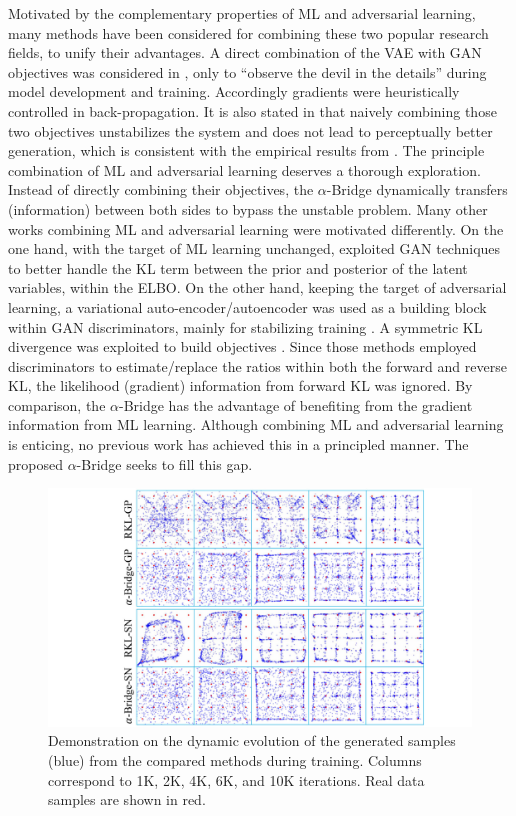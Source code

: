 \documentclass[letterpaper]{article} %
\begin{document}
Motivated by the complementary properties of ML and adversarial learning, many methods have been considered for combining these two popular research fields, to unify their advantages.
A direct combination of the VAE with GAN objectives was considered in \cite{larsen2015autoencoding}, only to ``observe the devil in the details'' during model development and training. Accordingly gradients were heuristically controlled in back-propagation.
It is also stated in \cite{mathieu2016disentangling} that naively combining
those two objectives unstabilizes the system and does not lead to perceptually better generation, which is consistent with the empirical results from \cite{zhang2019training}.
The principle combination of ML and adversarial learning deserves a thorough exploration.
Instead of directly combining their objectives, the $\alpha$-Bridge dynamically transfers (information) between both sides to bypass the unstable problem.
Many other works combining ML and adversarial learning were motivated differently. On the one hand, with the target of ML learning unchanged, \cite{makhzani2015adversarial,mescheder2017adversarial} exploited GAN techniques to better handle the KL term between the prior and posterior of the latent variables, within the ELBO. On the other hand, keeping the target of adversarial learning, a variational auto-encoder/autoencoder was used as a building block within GAN discriminators, mainly for stabilizing training
\cite{berthelot2017began,ulyanov2018takes}.
A symmetric KL divergence was exploited to build objectives \cite{pu2017adversarial,chen2018symmetric}. Since those methods employed discriminators to estimate/replace the ratios within both the forward and reverse KL, the likelihood (gradient) information from forward KL was ignored.
By comparison, the $\alpha$-Bridge has the advantage of benefiting from the gradient information from ML learning.
Although combining ML and adversarial learning is enticing, no previous work has achieved this in a principled manner.
The proposed $\alpha$-Bridge seeks to fill this gap.



\begin{figure}[tb]
	\centering
	\includegraphics[width=0.85\columnwidth]{Figures/25Gs_GenProcess_GP_SN.pdf}
	\caption{Demonstration on the dynamic evolution of the generated samples (blue) from the compared methods during training. Columns correspond to 1K, 2K, 4K, 6K, and 10K iterations. Real data samples are shown in red.
	}
	\label{fig:Sample_25G}
\end{figure}
\end{document}
